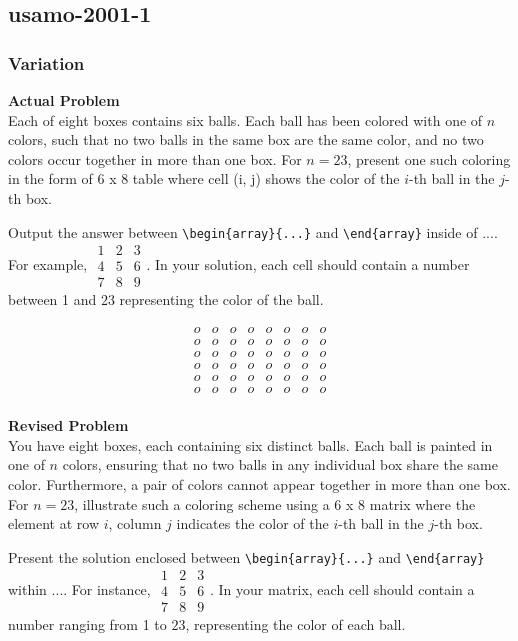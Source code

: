 \subsection{usamo-2001-1}
\subsubsection{Variation}
\textbf{Actual Problem}\\
Each of eight boxes contains six balls. Each ball has been colored with one of $n$ colors, such that no two balls in the same box are the same color, and no two colors occur together in more than one box.
For $n=23$, present one such coloring in the form of 6 x 8 table where cell (i, j) shows the color of the $i$-th ball in the $j$-th box.

Output the answer between \verb|\begin{array}{...}| and \verb|\end{array}| inside of $\boxed{...}$. For example, $\boxed{\begin{array}{ccc}1 & 2 & 3 \\ 4 & 5 & 6 \\ 7 & 8 & 9\end{array}}$.
In your solution, each cell should contain a number between 1 and $23$ representing the color of the ball.

$$\begin{array}{cccccccc}
o & o & o & o & o & o & o & o \\
o & o & o & o & o & o & o & o \\
o & o & o & o & o & o & o & o \\
o & o & o & o & o & o & o & o \\
o & o & o & o & o & o & o & o \\
o & o & o & o & o & o & o & o \\
\end{array}$$


\textbf{Revised Problem}\\
You have eight boxes, each containing six distinct balls. Each ball is painted in one of $n$ colors, ensuring that no two balls in any individual box share the same color. Furthermore, a pair of colors cannot appear together in more than one box. For $n=23$, illustrate such a coloring scheme using a 6 x 8 matrix where the element at row $i$, column $j$ indicates the color of the $i$-th ball in the $j$-th box.

Present the solution enclosed between \verb|\begin{array}{...}| and \verb|\end{array}| within $\boxed{...}$. For instance, $\boxed{\begin{array}{ccc}1 & 2 & 3 \\ 4 & 5 & 6 \\ 7 & 8 & 9\end{array}}$. In your matrix, each cell should contain a number ranging from 1 to $23$, representing the color of each ball.

